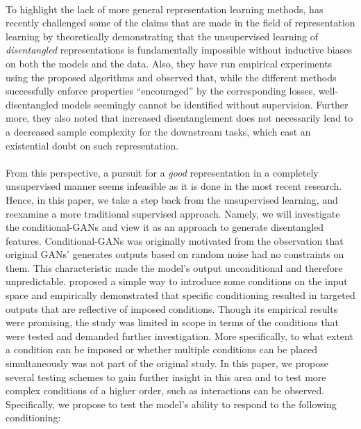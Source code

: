 \documentclass[11pt, letterpaper, oneside]{article}
\begin{document}
\paragraph{}
To highlight the lack of more general representation learning methods, \cite{locatello_challenging_2019} has recently challenged some of the claims that are made in the field of representation learning by theoretically demonstrating that the unsupervised learning of \textit{disentangled} representations is fundamentally impossible without inductive biases on both the models and the data. Also, they have run empirical experiments using the proposed algorithms and observed that, while the different methods successfully enforce properties “encouraged” by the corresponding losses, well-disentangled models seemingly cannot be identified without supervision. Further more, they also noted that increased disentanglement does not necessarily lead to a decreased sample complexity for the downstream tasks, which cast an existential doubt on such representation.     
\paragraph{}
From this perspective, a pursuit for a \textit{good} representation in a completely unsupervised manner seems infeasible as it is done in the most recent research. Hence, in this paper, we take a step back from the unsupervised learning, and reexamine a more traditional supervised approach. Namely, we will investigate the conditional-GANs \cite{mirza_conditional_nodate} and view it as an approach to generate disentangled features. Conditional-GANs was originally motivated from the observation that original GANs' generates outputs based on random noise had no constraints on them. This characteristic made the model's output unconditional and therefore unpredictable. \cite{mirza_conditional_nodate} proposed a simple way to introduce some conditions on the input space and empirically demonstrated that specific conditioning resulted in targeted outputs that are reflective of imposed conditions. Though its empirical results were promising, the study was limited in scope in terms of the conditions that were tested and demanded further investigation. More specifically, to what extent a condition can be imposed or whether multiple conditions can be placed simultaneously was not part of the original study. In this paper, we propose several testing schemes to gain further insight in this area and to test more complex conditions of a higher order, such as interactions can be observed. Specifically, we propose to test the model's ability to respond to the following conditioning:
\end{document}
